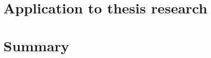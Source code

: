 \documentclass[../main]{subfiles}
\begin{document}

\section{Application to thesis research}
\label{sec:ch3_application}


\section{Summary}
\label{sec:ch3_summary}
\end{document}
